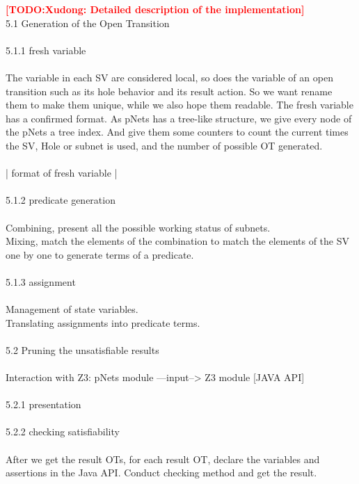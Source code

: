 \documentclass{lncs/llncs}
\newcommand{\TODO}[1]{\textcolor{red}{\textbf{[TODO:#1]}}}
\newcommand{\QIN}[1]{\textcolor{airforceblue}{#1}}
\begin{document}
\TODO{Xudong: Detailed description of the implementation}
\QIN{
\\
5.1 Generation of the Open Transition\\\\
5.1.1 fresh variable\\\\
The variable in each SV are considered local, so does the variable of an open transition such as its hole behavior and its result action.
So we want rename them to make them unique, while we also hope them readable. The fresh variable has a confirmed format.
As pNets has a tree-like structure, we give every node of the pNets a tree index. And give them some counters to count the current times the SV, Hole or subnet is used, and the number of possible OT generated. \\\\
| format of fresh variable |\\\\
5.1.2 predicate generation\\\\
Combining, present all the possible working status of subnets. \\
Mixing, match the elements of the combination to match the elements of the SV one by one to generate terms of a predicate.\\\\
5.1.3 assignment\\\\
Management of state variables.\\
Translating assignments into predicate terms.\\\\
5.2 Pruning the unsatisfiable results\\\\
Interaction with Z3: pNets module ---input--> Z3 module [JAVA API]\\\\
5.2.1 presentation\\\\
5.2.2 checking satisfiability\\\\
After we get the result OTs, for each result OT, declare the variables and assertions in the Java API. Conduct checking method and get the result.\\
}
\end{document}

